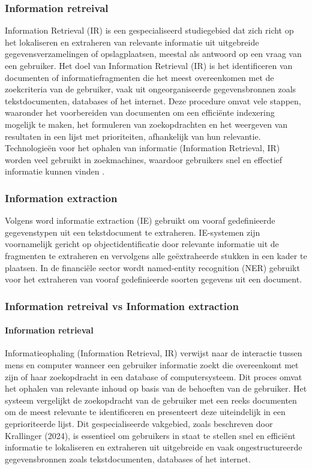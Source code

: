 \subsubsection{Information retreival}
Information Retrieval (IR) is een gespecialiseerd studiegebied dat zich richt op het lokaliseren en extraheren van relevante informatie uit uitgebreide gegevensverzamelingen of opslagplaatsen, meestal als antwoord op een vraag van een gebruiker. Het doel van Information Retrieval (IR) is het identificeren van documenten of informatiefragmenten die het meest overeenkomen met de zoekcriteria van de gebruiker, vaak uit ongeorganiseerde gegevensbronnen zoals tekstdocumenten, databases of het internet. Deze procedure omvat vele stappen, waaronder het voorbereiden van documenten om een efficiënte indexering mogelijk te maken, het formuleren van zoekopdrachten en het weergeven van resultaten in een lijst met prioriteiten, afhankelijk van hun relevantie. Technologieën voor het ophalen van informatie (Information Retrieval, IR) worden veel gebruikt in zoekmachines, waardoor gebruikers snel en effectief informatie kunnen vinden \autocite{Krallinger2024}.
\subsubsection{Information extraction}
Volgens \autocite{Gupta2020} word informatie extraction (IE) gebruikt om vooraf gedefinieerde gegevenstypen uit een tekstdocument te extraheren. IE-systemen zijn voornamelijk gericht op objectidentificatie door relevante informatie uit de fragmenten te extraheren en vervolgens alle geëxtraheerde stukken in een kader te plaatsen.
In de financiële sector wordt named-entity recognition (NER) gebruikt voor het extraheren van vooraf gedefinieerde soorten gegevens uit een document.

\subsubsection{Information retreival vs Information extraction}
\paragraph{Information retrieval}
Informatieophaling (Information Retrieval, IR) verwijst naar de interactie tussen mens en computer wanneer een gebruiker informatie zoekt die overeenkomt met zijn of haar zoekopdracht in een database of computersysteem. Dit proces omvat het ophalen van relevante inhoud op basis van de behoeften van de gebruiker. Het systeem vergelijkt de zoekopdracht van de gebruiker met een reeks documenten om de meest relevante te identificeren en presenteert deze uiteindelijk in een geprioriteerde lijst. Dit gespecialiseerde vakgebied, zoals beschreven door Krallinger (2024), is essentieel om gebruikers in staat te stellen snel en efficiënt informatie te lokaliseren en extraheren uit uitgebreide en vaak ongestructureerde gegevensbronnen zoals tekstdocumenten, databases of het internet.

